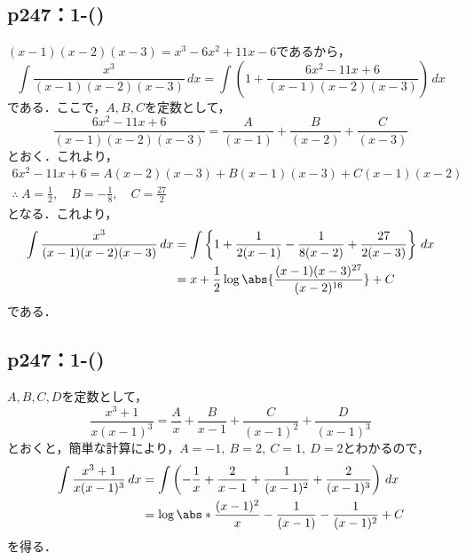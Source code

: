 \subsection*{p247：1-()}

\begin{tanswer}
    $(x-1)(x-2)(x-3)=x^3 -6x^2+11x-6$であるから，
    \[
        \int \frac{x^3}{(x-1)(x-2)(x-3)} \, dx  = \int \left (1+ \frac{6x^2-11x+6}{(x-1)(x-2)(x-3)}\right) \, dx
    \]
    である．ここで，$A,B,C$を定数として，
    \[
        \frac{6x^2-11x+6}{(x-1)(x-2)(x-3)} = \frac{A}{(x-1)}+\frac{B}{(x-2)}+\frac{C}{(x-3)}
    \]
    とおく．これより，
    \begin{gather*}
        6x^2-11x+6 = A(x-2)(x-3)+B (x-1)(x-3)+C(x-1)(x-2) \\
        \therefore ~ A = \frac{1}{2}, \quad B = -\frac{1}{8},\quad C= \frac{27}{2}
    \end{gather*}
    となる．これより，
    \begin{align*}
        \int \frac{x^3}{(x-1)(x-2)(x-3)} \, dx & = \int \left \{ 1+ \frac{1}{2(x-1)} - \frac{1}{8(x-2)}+\frac{27}{2(x-3)} \right \} \, dx \\
                                               & = x + \frac{1}{2} \log \abs{\frac{(x-1)(x-3)^{27}}{(x-2)^{16}}}+C
    \end{align*}
    である．
\end{tanswer}

\subsection*{p247：1-()}

\begin{tanswer}
    $A,B,C,D$を定数として，
    \[
        \frac{x^3+1}{x(x-1)^3} = \frac{A}{x}+\frac{B}{x-1}+\frac{C}{(x-1)^2}+\frac{D}{(x-1)^3}
    \]
    とおくと，簡単な計算により，$A=-1,~B=2,~C=1,~D=2$とわかるので，
    \begin{align*}
        \int \frac{x^3+1}{x(x-1)^3} \, dx & = \int \left (-\frac{1}{x}+\frac{2}{x-1}+\frac{1}{(x-1)^2}+\frac{2}{(x-1)^3} \right ) \, dx \\
                                          & = \log \abs*{\frac{(x-1)^2}{x}} -\frac{1}{(x-1)}-\frac{1}{(x-1)^2}+ C
    \end{align*}
    を得る．
\end{tanswer}



